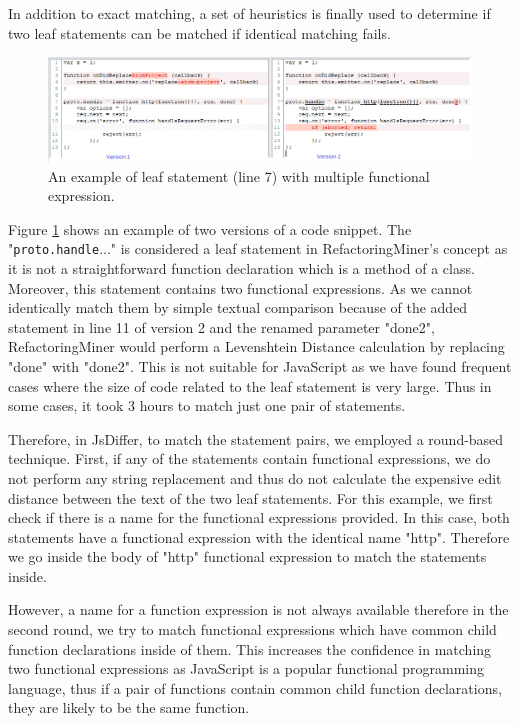 \documentclass[letterpaper,12pt,onecolumn,final]{report}
\begin{document}
In addition to exact matching, a set of heuristics is finally used to determine if two leaf statements can be matched if identical matching fails.

\begin{figure}
\includegraphics[width=\textwidth,height=\textheight,keepaspectratio]{images/leaf_matching.PNG}
  \caption{An example of leaf statement (line 7) with multiple functional expression.}
   \label{fig:leafMatching}
\end{figure} 


Figure \ref{fig:leafMatching} shows an example of two versions of a code snippet. The "\texttt{proto.handle}..." is considered a leaf statement in RefactoringMiner's concept as it is not a straightforward function declaration which is a method of a class. Moreover, this statement contains two functional expressions. As we cannot identically match them by simple textual comparison because of the added statement in line 11 of version 2 and the renamed parameter "done2", RefactoringMiner would perform a Levenshtein Distance calculation by replacing "done" with "done2". This is not suitable for JavaScript as we have found frequent cases where the size of code related to the leaf statement is very large. Thus in some cases, it took 3 hours to match just one pair of statements.

Therefore, in JsDiffer, to match the statement pairs, we employed a round-based technique. First, if any of the statements contain functional expressions, we do not perform any string replacement and thus do not calculate the expensive edit distance between the text of the two leaf statements. For this example, we first check if there is a name for the functional expressions provided. In this case, both statements have a functional expression with the identical name "http". Therefore we go inside the body of "http" functional expression to match the statements inside. 

However, a name for a function expression is not always available therefore in the second round, we try to match functional expressions which have common child function declarations inside of them. This increases the confidence in matching two functional expressions as JavaScript is a popular functional programming language, thus if a pair of functions contain common child function declarations, they are likely to be the same function.
\end{document}

